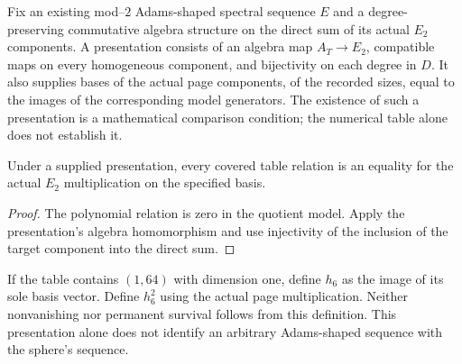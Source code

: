 \begin{definition}
  \label{def:adams-e2-table-presentation}
  Fix an existing mod--$2$ Adams-shaped spectral sequence $E$ and a
  degree-preserving commutative algebra structure on the direct sum of its
  actual $E_2$ components.  A presentation consists of an algebra map
  $A_T\to E_2$, compatible maps on every homogeneous component, and
  bijectivity on each degree in $D$.  It also supplies bases of the actual
  page components, of the recorded sizes, equal to the images of the
  corresponding model generators.  The existence of such a presentation is a mathematical
  comparison condition; the numerical table alone does not establish it.
\end{definition}

\begin{lemma}
  \label{lem:adams-e2-table-product}
  Under a supplied presentation, every covered table relation is an
  equality for the actual $E_2$ multiplication on the specified basis.
\end{lemma}
\begin{proof}
  The polynomial relation is zero in the quotient model.  Apply the
  presentation's algebra homomorphism and use injectivity of the inclusion
  of the target component into the direct sum.
\end{proof}

\begin{definition}
  \label{def:adams-e2-imported-h6}
  If the table contains $(1,64)$ with dimension one, define $h_6$ as the
  image of its sole basis vector.  Define $h_6^2$ using the actual page
  multiplication.  Neither nonvanishing nor permanent survival follows from this
  definition.  This presentation alone does not identify an arbitrary
  Adams-shaped sequence with the sphere's sequence.
\end{definition}

